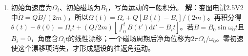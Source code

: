 \documentclass[UTF8,fontset=fandol,a4paper,11pt]{ctexart}
\begin{document}
\begin{enumerate}
\item 初始角速度为$\Omega_i$、初始磁场为$B_i$，写角运动的一般积分。
\textbf{解：}变图电试2.5V2中$\dot\Omega=Q\dot B/(2m)$，所以$\Omega(t)=\Omega_i+Q[B(t)-B_i]/(2m)$。再积分得$\theta(t)-\theta(0)=\Omega_it+(Q/2m)[\int_0^tB(t')\mathrm dt'-B_it]$。若$B=B_0\sin\omega_0t$且$B_i=0$，角度含$\Omega_it$的线性漂移；一个磁场周期后净角位移为$2\pi\Omega_i/\omega_0$。零初速使这个漂移项消失，才形成题设的往返角运动。
\begin{center}\begin{minipage}{.98\linewidth}\centering
{}
\end{minipage}
\end{center}
\end{enumerate}
\end{document}
